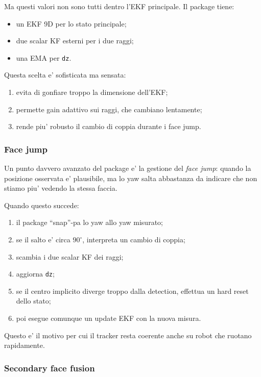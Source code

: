 \documentclass[11pt,a4paper]{article}
\newcommand{\code}[1]{\texttt{#1}}
\begin{document}
Ma questi valori non sono tutti dentro l'EKF principale. Il package tiene:
\begin{itemize}[leftmargin=1.4em]
  \item un EKF 9D per lo stato principale;
  \item due scalar KF esterni per i due raggi;
  \item una EMA per \code{dz}.
\end{itemize}

Questa scelta e' sofisticata ma sensata:
\begin{enumerate}[leftmargin=1.4em]
  \item evita di gonfiare troppo la dimensione dell'EKF;
  \item permette gain adattivo sui raggi, che cambiano lentamente;
  \item rende piu' robusto il cambio di coppia durante i face jump.
\end{enumerate}

\subsubsection{Face jump}

Un punto davvero avanzato del package e' la gestione del \emph{face jump}: quando la posizione osservata e' plausibile, ma lo yaw salta abbastanza da indicare che non stiamo piu' vedendo la stessa faccia.

Quando questo succede:
\begin{enumerate}[leftmargin=1.4em]
  \item il package ``snap''-pa lo yaw allo yaw misurato;
  \item se il salto e' circa \(90^\circ\), interpreta un cambio di coppia;
  \item scambia i due scalar KF dei raggi;
  \item aggiorna \code{dz};
  \item se il centro implicito diverge troppo dalla detection, effettua un hard reset dello stato;
  \item poi esegue comunque un update EKF con la nuova misura.
\end{enumerate}

Questo e' il motivo per cui il tracker resta coerente anche su robot che ruotano rapidamente.

\subsubsection{Secondary face fusion}
\end{document}
